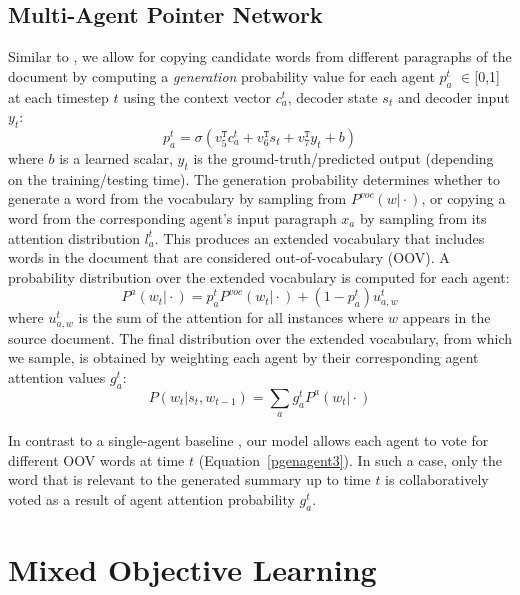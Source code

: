 \documentclass[11pt,a4paper]{article}
\begin{document}
%
 \subsection{Multi-Agent Pointer Network}
\label{sec:mapointernet}


Similar to \citet{summpoinernet}, we allow for copying candidate words from different paragraphs of the document by computing a \textit{generation} probability value for each agent $p_a^t$ $\in$[0,1] at each timestep $t$ using the context vector $c_{a}^t$, decoder state $s_t$ and decoder input $y_t$:
\vspace*{-1mm}
\begin{equation}
p_a^t=\sigma(v_5^{\mathtt{T}}c_{a}^t + v_6^{\mathtt{T}}s_t+v_7^{\mathtt{T}}y_t+b)
\label{pgenagent1}
\end{equation}
where $b$ is a learned scalar, $y_t$ is the ground-truth/predicted output (depending on the training/testing time). The generation probability determines whether to generate a word from the vocabulary by sampling from $P^{voc}(w\vert \cdot)$, or copying a word from the corresponding agent's input paragraph $x_a$ by sampling from its attention distribution $l_a^t$. 
This produces an extended vocabulary that includes words in the document that are considered out-of-vocabulary (OOV).
A probability distribution over the extended vocabulary is computed for each agent:
\begin{equation}
P^a(w_t \vert \cdot )=p_a^tP^{voc}(w_t \vert \cdot) + (1-p_a^t) \textstyle u_{a,w}^t
\label{pgenagent2}
\end{equation}
 where $u_{a,w}^t$ is the sum of the attention for all instances where $w$ appears in the source document.
The final distribution over the extended vocabulary, from which we sample, is obtained by weighting each agent by their corresponding agent attention values $g_a^t$:
\begin{equation}
P(w_t \vert s_t, w_{t-1})=\textstyle \sum_{a} g^t_aP^a(w_t \vert \cdot )
\label{pgenagent3}
\end{equation}

\noindent In contrast to a single-agent baseline \cite{summpoinernet}, our model allows each agent to vote for different OOV words at time $t$ (Equation~\eqref{pgenagent3}). In such a case, only the word that is relevant to the generated summary up to time $t$ is collaboratively voted as a result of agent attention probability $g_a^t$.    \section{Mixed Objective Learning}
\label{ssec:rewards}
\end{document}
